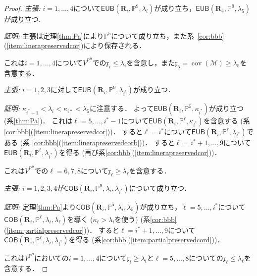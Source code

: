\documentclass[uplatex,dvipdfmx]{jsarticle}
\newcommand{\cov}{\operatorname{cov}}
\newcommand{\EUB}{\mathsf{EUB}}
\newcommand{\COB}{\mathsf{COB}}
\newcommand{\relR}{\mathbf{R}}
\newcommand{\Pa}{\mathbb{P}^5}
\newcommand{\Paell}{\mathbb{P}^\ell}
\newcommand{\PaIX}{\mathbb{P}^9}
\newcommand{\covmeager}{\cov(\mathcal M)}
\theoremstyle{definition}
\begin{document}
\begin{proof}
		
		\emph{主張:} $i=1,\dots,4$について$\EUB(\relR_i, \PaIX,\lambda_i)$が成り立ち，$\EUB(\relR_4, \PaIX,\lambda_5)$が成り立つ.
		
		\emph{証明:}  主張は定理\ref{thm:Pa}により$\Pa$について成り立ち，また系~\ref{cor:bbb}(\ref{item:linerapreservedcor})により保存される．
		
		これは$i=1,\dots,4$について$V^{\PaIX}$での$\mathfrak x_i\le \lambda_i$を含意し，また$\mathfrak x_5=\covmeager\ge \lambda_5$を含意する．
		
		\emph{主張:} $i=1,2,3$に対して$\EUB(\relR_i, \PaIX,\lambda_{i^*})$が成り立つ．
		
		\emph{証明:}  $\kappa_{i^*+1}<\lambda_i<\kappa_{i*}<\lambda_5$に注意する．
		よって$\EUB(\relR_i, \Pa,\kappa_{i^*})$が成り立つ (系\ref{thm:Pa})．
		これは$\ell=5,\dots,i^*-1$について$\EUB(\relR_i, \Paell,\kappa_{i^*})$を含意する (系\ref{cor:bbb}(\ref{item:linerapreservedcor}))．
		すると$\ell=i^*$について$\EUB(\relR_i, \Paell,\lambda_{i^*})$である (系 \ref{cor:bbb}(\ref{item:linerapreservedcorb}))．
		すると$\ell=i^*+1,\dots,9$について$\EUB(\relR_i, \Paell,\lambda_{i^*})$を得る (再び系\ref{cor:bbb}(\ref{item:linerapreservedcor}))．
		
		これは$V^{\PaIX}$での$\ell=6,7,8$について$\mathfrak x_{\ell}\ge \lambda_{\ell}$を含意する．
		
		
		\emph{主張:} $i=1,2,3,4$が$\COB(\relR_i, \PaIX,\lambda_i,\lambda_{i^*})$について成り立つ．
		
		\emph{証明:}  定理\ref{thm:Pa}より$\COB(\relR_i, \Pa,\lambda_i,\lambda_5)$が成り立ち，$\ell=5,\dots,i^*$について$\COB(\relR_i, \Paell,\lambda_i,\lambda_\ell)$を導く ($\kappa_\ell>\lambda_i$を使う) (系\ref{cor:bbb}(\ref{item:partialpreservedcor}))．
		すると$\ell=i^*+1,\dots,9$について$\COB(\relR_i, \Paell,\lambda_i,\lambda_{i^*})$を得る (系\ref{cor:bbb}(\ref{item:partialpreservedcord}))．
		
		これは$V^{\PaIX}$においての$i=1,\dots,4$について$\mathfrak x_i\ge \lambda_i$と$\ell=5,\dots,8$についての$\mathfrak x_\ell\le \lambda_{\ell}$を含意する．
	\end{proof}


	\nocite{*}
	\printbibliography[title={参考文献}]
\end{document}
